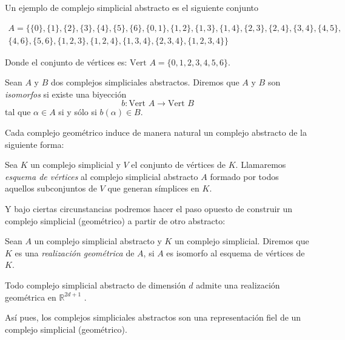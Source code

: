 \begin{exmp}
Un ejemplo de complejo simplicial abstracto es el siguiente conjunto 

\begin{gather*}
A = \{\{0\},\{1\},\{2\},\{3\},\{4\},\{5\},\{6\},\{0,1\},\{1,2\},\{1,3\},\{1,4\},\{2,3\},\{2,4\},\{3,4\},\{4,5\},\\
\{4,6\},\{5,6\},\{1,2,3\},\{1,2,4\},\{1,3,4\},\{2,3,4\},\{1,2,3,4\}\}
\end{gather*}

Donde el conjunto de vértices es: $\text{Vert }A = \{0, 1, 2, 3, 4, 5, 6\}$.
\end{exmp}

\begin{definition}
Sean $A$ y $B$ dos complejos simpliciales abstractos. Diremos que $A$ y $B$ son \emph{isomorfos} si existe una biyección \[b:\text{Vert }A \to \text{Vert }B\] tal que $\alpha \in A$ si y sólo si $b(\alpha) \in B$.
\end{definition}

Cada complejo geométrico induce de manera natural un complejo abstracto de la siguiente forma:
\begin{definition}
Sea $K$ un complejo simplicial y $V$ el conjunto de vértices de $K$. Llamaremos \emph{esquema de vértices} al complejo simplicial abstracto $A$ formado por todos aquellos subconjuntos de $V$ que generan símplices en $K$.
\end{definition}

Y bajo ciertas circunstancias podremos hacer el paso opuesto de construir un complejo simplicial (geométrico) a partir de otro abstracto:
\begin{definition}
Sean $A$ un complejo simplicial abstracto y $K$ un complejo simplicial. Diremos que $K$ es una \emph{realización geométrica} de $A$, si $A$ es isomorfo al esquema de vértices de $K$.
\end{definition}

\begin{theorem}
Todo complejo simplicial abstracto de dimensión $d$ admite una realización geométrica en $\mathbb{R}^{2d + 1}$ \cite{libroEH}.
\end{theorem}

Así pues, los complejos simpliciales abstractos son una representación fiel de un complejo simplicial (geométrico).

